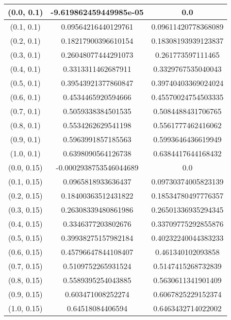 \begin{table}[H]
\begin{tabular}{|c|c|c|}
(0.0, 0.1) & -9.619862459449985e-05 & 0.0 \\
\hline
(0.1, 0.1) & 0.09564216440129761 & 0.09611420778368089 \\
\hline
(0.2, 0.1) & 0.18217900396610154 & 0.18308193939123837 \\
\hline
(0.3, 0.1) & 0.26048077444291073 & 0.261773597111465 \\
\hline
(0.4, 0.1) & 0.3313311462687911 & 0.3329767535040043 \\
\hline
(0.5, 0.1) & 0.39543921377860847 & 0.39740403369024024 \\
\hline
(0.6, 0.1) & 0.4534465920594666 & 0.45570024754503335 \\
\hline
(0.7, 0.1) & 0.5059338384501535 & 0.5084488431706765 \\
\hline
(0.8, 0.1) & 0.5534262629541198 & 0.5561777462416062 \\
\hline
(0.9, 0.1) & 0.5963991857185563 & 0.5993646436619949 \\
\hline
(1.0, 0.1) & 0.6398090564126738 & 0.6384417644168432 \\
\hline
\hline
(0.0, 0.15) & -0.0002938753546044689 & 0.0 \\
\hline
(0.1, 0.15) & 0.0965818933636437 & 0.09730374005823139 \\
\hline
(0.2, 0.15) & 0.18400363512431822 & 0.18534780497776357 \\
\hline
(0.3, 0.15) & 0.26308339480861986 & 0.26501336935294345 \\
\hline
(0.4, 0.15) & 0.3346377203802676 & 0.33709775292855876 \\
\hline
(0.5, 0.15) & 0.39938275157982184 & 0.40232240044383233 \\
\hline
(0.6, 0.15) & 0.45796647844108407 & 0.461340102093858 \\
\hline
(0.7, 0.15) & 0.5109752265931524 & 0.5147415268732839 \\
\hline
(0.8, 0.15) & 0.5589395254043885 & 0.5630611341901409 \\
\hline
(0.9, 0.15) & 0.603471008252274 & 0.6067825229152374 \\
\hline
(1.0, 0.15) & 0.64518084406594 & 0.6463432714022002 \\
\hline
\end{tabular}
\end{table}
